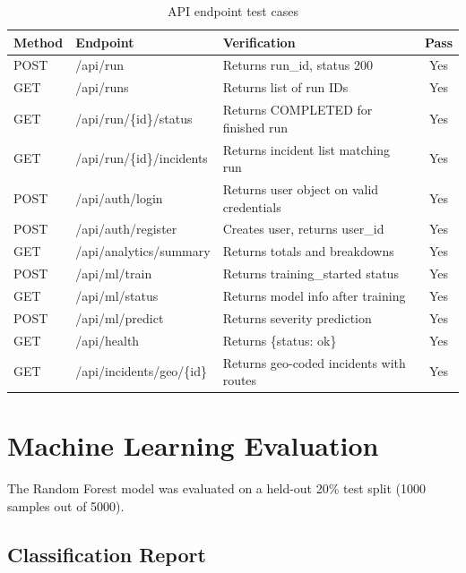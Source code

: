 \begin{table}[H]
\centering
\caption{API endpoint test cases}
\label{tab:api_tests}
\begin{tabularx}{\textwidth}{|l|l|X|c|}
\hline
\textbf{Method} & \textbf{Endpoint} & \textbf{Verification} & \textbf{Pass} \\
\hline
POST & /api/run & Returns run\_id, status 200 & Yes \\
\hline
GET & /api/runs & Returns list of run IDs & Yes \\
\hline
GET & /api/run/\{id\}/status & Returns COMPLETED for finished run & Yes \\
\hline
GET & /api/run/\{id\}/incidents & Returns incident list matching run & Yes \\
\hline
POST & /api/auth/login & Returns user object on valid credentials & Yes \\
\hline
POST & /api/auth/register & Creates user, returns user\_id & Yes \\
\hline
GET & /api/analytics/summary & Returns totals and breakdowns & Yes \\
\hline
POST & /api/ml/train & Returns training\_started status & Yes \\
\hline
GET & /api/ml/status & Returns model info after training & Yes \\
\hline
POST & /api/ml/predict & Returns severity prediction & Yes \\
\hline
GET & /api/health & Returns \{status: ok\} & Yes \\
\hline
GET & /api/incidents/geo/\{id\} & Returns geo-coded incidents with routes & Yes \\
\hline
\end{tabularx}
\end{table}

\section{Machine Learning Evaluation}
\label{sec:ml_evaluation}

The Random Forest model was evaluated on a held-out 20\% test split (1000 samples out of 5000).

\subsection{Classification Report}

